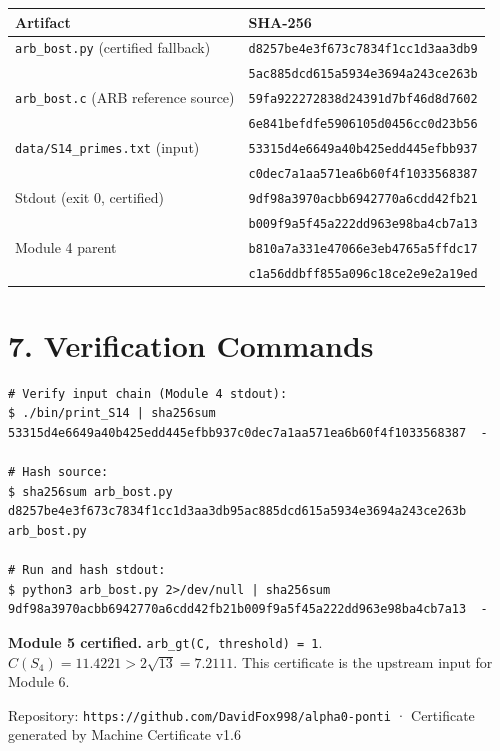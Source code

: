 \documentclass[11pt,letterpaper]{article}
\begin{document}
\begin{center}
\begin{tabular}{|l|l|}
\hline
\textbf{Artifact} & \textbf{SHA-256} \\
\hline
\texttt{arb\_bost.py} (certified fallback) & \texttt{d8257be4e3f673c7834f1cc1d3aa3db9} \\
 & \texttt{5ac885dcd615a5934e3694a243ce263b} \\
\hline
\texttt{arb\_bost.c} (ARB reference source) & \texttt{59fa922272838d24391d7bf46d8d7602} \\
 & \texttt{6e841befdfe5906105d0456cc0d23b56} \\
\hline
\texttt{data/S14\_primes.txt} (input) & \texttt{53315d4e6649a40b425edd445efbb937} \\
 & \texttt{c0dec7a1aa571ea6b60f4f1033568387} \\
\hline
Stdout (exit 0, certified) & \texttt{9df98a3970acbb6942770a6cdd42fb21} \\
 & \texttt{b009f9a5f45a222dd963e98ba4cb7a13} \\
\hline
Module 4 parent & \texttt{b810a7a331e47066e3eb4765a5ffdc17} \\
 & \texttt{c1a56ddbff855a096c18ce2e9e2a19ed} \\
\hline
\end{tabular}
\end{center}

\section*{7. Verification Commands}

\begin{lstlisting}
# Verify input chain (Module 4 stdout):
$ ./bin/print_S14 | sha256sum
53315d4e6649a40b425edd445efbb937c0dec7a1aa571ea6b60f4f1033568387  -

# Hash source:
$ sha256sum arb_bost.py
d8257be4e3f673c7834f1cc1d3aa3db95ac885dcd615a5934e3694a243ce263b  arb_bost.py

# Run and hash stdout:
$ python3 arb_bost.py 2>/dev/null | sha256sum
9df98a3970acbb6942770a6cdd42fb21b009f9a5f45a222dd963e98ba4cb7a13  -
\end{lstlisting}

\vspace{0.5em}
\noindent\textbf{Module 5 certified.} \texttt{arb\_gt(C, threshold) = 1}.
$C(S_4) = 11.4221 > 2\sqrt{13} = 7.2111$.
This certificate is the upstream input for Module 6.

\vspace{0.5em}
\noindent\small Repository: \texttt{https://github.com/DavidFox998/alpha0-ponti} ·
Certificate generated by Machine Certificate v1.6
\end{document}

